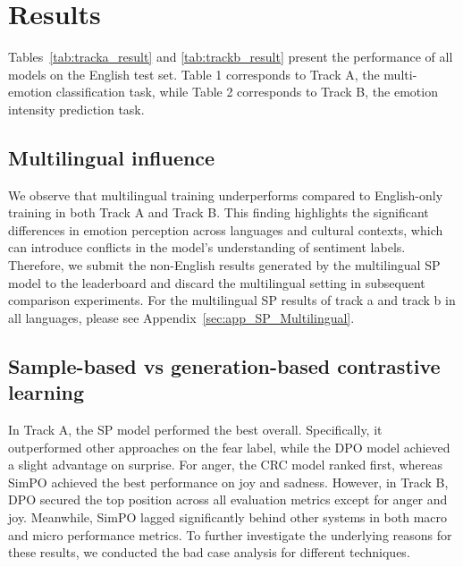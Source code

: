 \documentclass[11pt]{article}
\begin{document}
\section{Results}


Tables~\ref{tab:tracka_result} and \ref{tab:trackb_result} present the performance of all models on the English test set. Table 1 corresponds to Track A, the multi-emotion classification task, while Table 2 corresponds to Track B, the emotion intensity prediction task.

\subsection{Multilingual influence}


We observe that multilingual training underperforms compared to English-only training in both Track A and Track B. This finding highlights the significant differences in emotion perception across languages and cultural contexts, which can introduce conflicts in the model’s understanding of sentiment labels. Therefore, we submit the non-English results generated by the multilingual SP model to the leaderboard and discard the multilingual setting in subsequent comparison experiments. For the multilingual SP results of track a and track b in all languages, please see Appendix~\ref{sec:app_SP_Multilingual}.

\subsection{Sample-based vs generation-based contrastive learning}


In Track A, the SP model performed the best overall. Specifically, it outperformed other approaches on the fear label, while the DPO model achieved a slight advantage on surprise. For anger, the CRC model ranked first, whereas SimPO achieved the best performance on joy and sadness. However, in Track B, DPO secured the top position across all evaluation metrics except for anger and joy. Meanwhile, SimPO lagged significantly behind other systems in both macro and micro performance metrics. To further investigate the underlying reasons for these results, we conducted the bad case analysis for different techniques.
\end{document}
